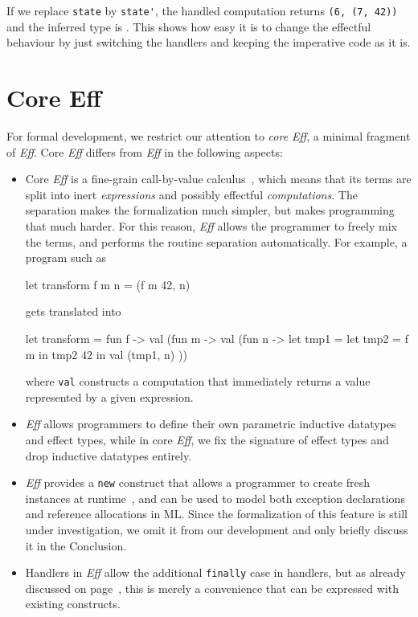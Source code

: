 \documentclass{LMCS}
\newcommand{\Eff}{\emph{Eff}\xspace}
\let\inline\lstinline
\begin{document}
If we replace \inline{state} by \inline{state'},
the handled computation returns \inline{(6, (7, 42))} and the inferred type is .
This shows how easy it is to change the effectful behaviour by just switching the handlers and keeping the imperative code as it is.

\section{Core Eff}
\label{sec:core-eff}

For formal development,
we restrict our attention to \emph{core \Eff}, a minimal fragment of \Eff.
Core \Eff differs from \Eff in the following aspects:
\begin{itemize}
  \item
    Core \Eff is a fine-grain call-by-value calculus~\cite{levy03modelling},
    which means that its terms are split into
    inert \emph{expressions} and possibly effectful \emph{computations}.
    The separation makes the formalization much simpler,
    but makes programming that much harder.
    For this reason, \Eff allows the programmer to freely mix the terms,
    and performs the routine separation automatically.
    For example, a program such as
\begin{source}
  let transform f m n = (f m 42, n)
    \end{source}
gets translated into\enlargethispage{\baselineskip}
    \begin{source}
  let transform = fun f -> val (fun m -> val (fun n ->
    let tmp1 =
      let tmp2 = f m in
      tmp2 42
    in
    val (tmp1, n)
  ))
    \end{source}
    where \inline{val} constructs a computation that immediately returns
    a value represented by a given expression.
  \item
    \Eff allows programmers to define their own parametric inductive datatypes and effect types,
    while in core \Eff, we fix the signature of effect types and drop inductive datatypes entirely.
  \item
    \Eff provides a \inline{new} construct
    that allows a programmer to create fresh instances at runtime~\cite{bauer2012programming},
    and can be used to model both exception declarations and reference allocations in ML.
    Since the formalization of this feature is still under investigation, we omit it from our development
    and only briefly discuss it in the Conclusion.
  \item
    Handlers in \Eff allow the additional \inline{finally} case in handlers,
    but as already discussed on page~\pageref{page:finally},
    this is merely a convenience that can be expressed with existing constructs.
\end{itemize}
\end{document}
